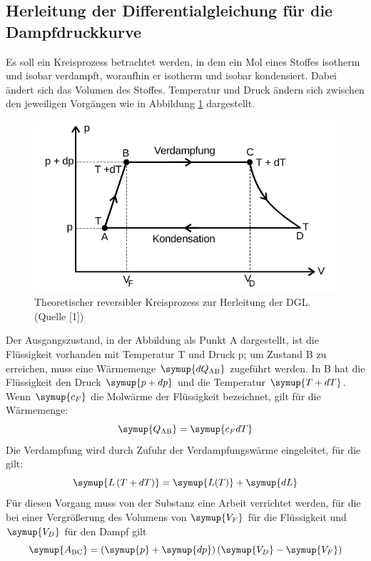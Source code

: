\subsection{Herleitung der Differentialgleichung für die Dampfdruckkurve}
Es soll ein Kreisprozess betrachtet werden, in dem ein Mol eines Stoffes isotherm und isobar verdampft, 
woraufhin er isotherm und isobar kondensiert. Dabei ändert sich das Volumen des Stoffes. Temperatur
und Druck ändern sich zwischen den jeweiligen Vorgängen wie in Abbildung \ref{fig:kreis} dargestellt.
\begin{figure}
    \centering
    \includegraphics[width=\textwidth]{kreisprozess.png}
    \caption{Theoretischer reversibler Kreisprozess zur Herleitung der DGL.(Quelle [1])}
    \label{fig:kreis}
\end{figure}
Der Ausgangszustand, in der Abbildung als Punkt A dargestellt, ist die Flüssigkeit vorhanden mit 
Temperatur T und Druck p; um Zustand B zu erreichen, muss eine Wärmemenge $\symup{dQ_\text{AB}}$
zugeführt werden. In B hat die Flüssigkeit den Druck $\symup{p + dp}$ und die Temperatur $\symup{T + dT}$.
Wenn $\symup{c_F}$ die Molwärme der Flüssigkeit bezeichnet, gilt für die Wärmemenge:
\begin{equation*}
\symup{Q_\text{AB}}  = \symup{c_F dT}
\end{equation*}
Die Verdampfung wird durch Zufuhr der Verdampfungswärme eingeleitet, für die gilt:
\begin{equation*}
\symup{L \left( T + dT \right)} = \symup{L(T)} + \symup{dL}
\end{equation*}
Für diesen Vorgang muss von der Substanz eine Arbeit verrichtet werden, für die bei einer Vergrößerung
des Volumens von $\symup{V_F}$ für die Flüssigkeit und $\symup{V_D}$ für den Dampf gilt
\begin{equation*}
\symup{A_\text{BC}} = \left( \symup{p} + \symup{dp} \right) \left( \symup{V_D} - \symup{V_F} \right)
\end{equation*}
